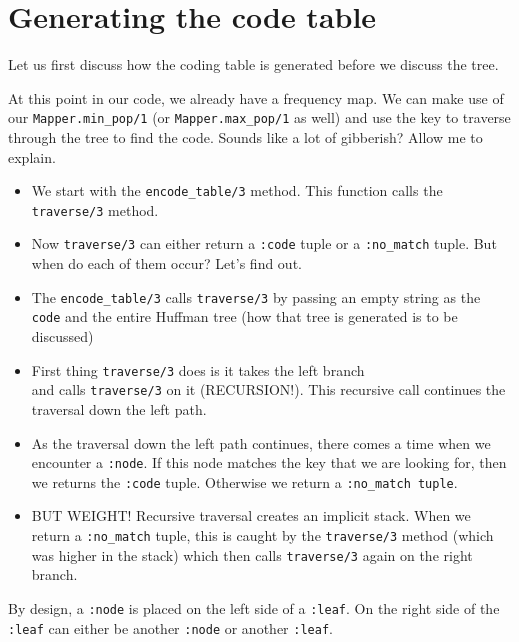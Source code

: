 \section{Generating the code table}
Let us first discuss how the coding table is generated before we discuss the tree.

At this point in our code, we already have a frequency map. We can make use of our \texttt{Mapper.min\_pop/1} (or \texttt{Mapper.max\_pop/1} as well) and use the key to traverse through the tree to find the code. Sounds like a lot of gibberish? Allow me to explain.

\begin{itemize}
    \item We start with the \texttt{encode\_table/3} method. This function calls the \\ \texttt{traverse/3} method.
    \item Now \texttt{traverse/3} can either return a \texttt{:code} tuple or a \texttt{:no\_match} tuple. But when do each of them occur? Let's find out.
    \item The \texttt{encode\_table/3} calls \texttt{traverse/3} by passing an empty string as the \texttt{code} and the entire Huffman tree (how that tree is generated is to be discussed)
    \item First thing \texttt{traverse/3} does is it takes the left branch \\ and calls \texttt{traverse/3} on it (RECURSION!). This recursive call continues the traversal down the left path.
    \item As the traversal down the left path continues, there comes a time when we encounter a \texttt{:node}. If this node matches the key that we are looking for, then we returns the \texttt{:code} tuple. Otherwise we return a \texttt{:no\_match tuple}.
    \item BUT WEIGHT! Recursive traversal creates an implicit stack. When we return a \texttt{:no\_match} tuple, this is caught by the \texttt{traverse/3} method (which was higher in the stack) which then calls \texttt{traverse/3} again on the right branch.
\end{itemize}

By design, a \texttt{:node} is placed on the left side of a \texttt{:leaf}. On the right side of the \texttt{:leaf} can either be another \texttt{:node} or another \texttt{:leaf}.

